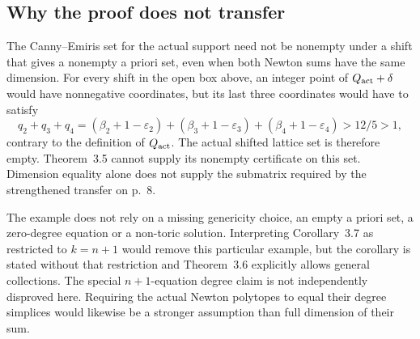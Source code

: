 \documentclass[10pt]{article}
\begin{document}
\subsection*{Why the proof does not transfer}
The Canny–Emiris set for the actual support need not be nonempty under a shift that gives a nonempty a priori set, even when both Newton sums have the same dimension. For every shift in the open box above, an integer point of \(Q_{\rm act}+\delta\) would have nonnegative coordinates, but its last three coordinates would have to satisfy \[q_2+q_3+q_4
 =(\beta_2+1-\varepsilon_2)+(\beta_3+1-\varepsilon_3)
   +(\beta_4+1-\varepsilon_4)>12/5>1,\] contrary to the definition of \(Q_{\rm act}\). The actual shifted lattice set is therefore empty. Theorem 3.5 cannot supply its nonempty certificate on this set. Dimension equality alone does not supply the submatrix required by the strengthened transfer on p. 8.\par
The example does not rely on a missing genericity choice, an empty a priori set, a zero-degree equation or a non-toric solution. Interpreting Corollary 3.7 as restricted to \(k=n+1\) would remove this particular example, but the corollary is stated without that restriction and Theorem 3.6 explicitly allows general collections. The special \(n+1\)-equation degree claim is not independently disproved here. Requiring the actual Newton polytopes to equal their degree simplices would likewise be a stronger assumption than full dimension of their sum.\par
\end{document}
